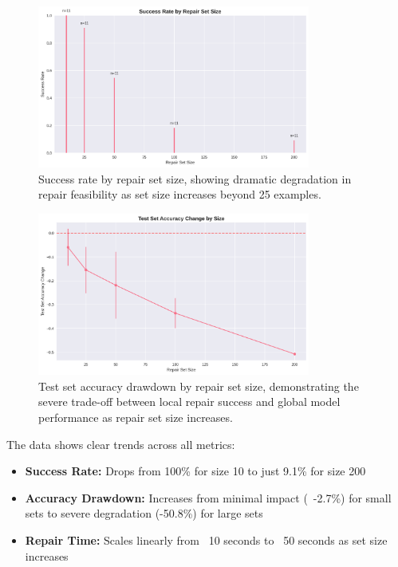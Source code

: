 \documentclass{article}
\begin{document}
\begin{figure}[h]
	\centering
	\includegraphics[width=0.8\textwidth]{results/one_shot_analysis/success_rates/success_rate_by_size.png}
	\caption{Success rate by repair set size, showing dramatic degradation in repair feasibility as set size increases beyond 25 examples.}
	\label{fig:success_rate_by_size}
\end{figure}

\begin{figure}[h]
	\centering
	\includegraphics[width=0.8\textwidth]{results/one_shot_analysis/accuracy/accuracy_change_by_size.png}
	\caption{Test set accuracy drawdown by repair set size, demonstrating the severe trade-off between local repair success and global model performance as repair set size increases.}
	\label{fig:accuracy_drawdown_by_size}
\end{figure}

The data shows clear trends across all metrics:
\begin{itemize}
	\item \textbf{Success Rate:} Drops from 100\% for size 10 to just 9.1\% for size 200
	\item \textbf{Accuracy Drawdown:} Increases from minimal impact (~-2.7\%) for small sets to severe degradation (-50.8\%) for large sets
	\item \textbf{Repair Time:} Scales linearly from ~10 seconds to ~50 seconds as set size increases
\end{itemize}
\end{document}
